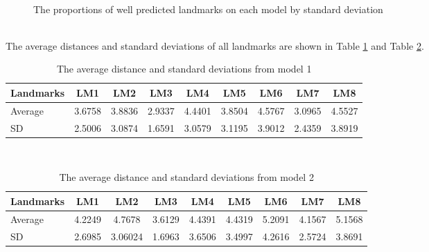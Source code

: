 \documentclass[12pt,a4paper]{article}
\begin{document}
\begin{figure}[h!]
\centering
{}~~
\caption{The proportions of well predicted landmarks on each model by standard deviation}
\label{expr22s}
\end{figure}~\\
The average distances and standard deviations of all landmarks are shown in Table \ref{sdmodel1} and Table \ref{sdmodel2}.
\begin{table}[h!]
	\centering
	\begin{tabular}{l c c c c c c c c}
		Landmarks & LM1 & LM2 & LM3 & LM4 & LM5 & LM6 & LM7 & LM8 \\ \hline
		Average & 3.6758 &	3.8836 & 	2.9337 & 	4.4401 &	 3.8504 &	4.5767 &	 3.0965 &	4.5527

 \\ \hline
		SD & 2.5006 &	3.0874 & 	1.6591 & 	3.0579 & 	3.1195 &	 3.9012 &	2.4359 &	3.8919
 \\ \hline
	\end{tabular}
	\caption{The average distance and standard deviations from model 1}
	\label{sdmodel1}
\end{table}~\\
\begin{table}[h!]
	\centering
	\begin{tabular}{l c c c c c c c c}
		Landmarks & LM1 & LM2 & LM3 & LM4 & LM5 & LM6 & LM7 & LM8 \\ \hline
		Average & 4.2249 & 4.7678 & 3.6129 &	4.4391	 & 4.4319	& 5.2091 &	 4.1567 &	5.1568
 \\ \hline
		SD & 2.6985 &	3.06024 & 1.6963	& 3.6506 & 	3.4997 &	4.2616 &	2.5724 &	3.8691
 \\ \hline
	\end{tabular}
	\caption{The average distance and standard deviations from model 2}
	\label{sdmodel2}
\end{table}~\\[3cm]
\end{document}
